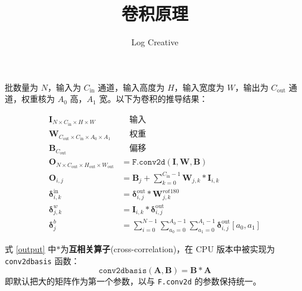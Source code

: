 \documentclass{ctexart}
\begin{document}
    \title{卷积原理}
    \author{Log Creative}
    \date{}
    \maketitle

    批数量为 $N$，输入为 $C_\text{in}$ 通道，输入高度为 $H$，输入宽度为 $W$，输出为 $C_\text{out}$ 通道，权重核为 $A_0$ 高，$A_1$ 宽。以下为卷积的推导结果\cite{gate}：

    \begin{align}
        \mathbf{I}_{N\times C_\text{in}\times H\times W}&\quad\text{输入}\nonumber\\
        \mathbf{W}_{C_\text{out}\times C_\text{in}\times A_0\times A_1}&\quad\text{权重}\nonumber\\
        \mathbf{B}_{C_\text{out}}&\quad\text{偏移}\nonumber\\
        \mathbf{O}_{N\times C_\text{out}\times H_\text{out}\times W_\text{out}}&=\texttt{F.conv2d}(\mathbf{I},\mathbf{W},\mathbf{B})\\
        \mathbf{O}_{i,j}&=\mathbf{B}_j+\sum_{k=0}^{C_\text{in}-1}\mathbf{W}_{j,k}*\mathbf{I}_{i,k}\label{output}\\
        \mathbf{\delta}^\text{in}_{i,k}&=\mathbf{\delta}^\text{out}_{i,j}*\mathbf{W}^{rot180}_{j,k}\label{deltain}\\
        \mathbf{\delta}^{w}_{j,k}&=\mathbf{I}_{i,k}*\mathbf{\delta}^\text{out}_{i,j}\label{deltaweight}\\
        \mathbf{\delta}^{b}_{j}&=\sum_{i=0}^{N-1}\sum_{a_0=0}^{A_0-1}\sum_{a_1=0}^{A_1-1}\mathbf{\delta}^\text{out}_{i,j}[a_0,a_1]\label{deltabia}
    \end{align}

    式 \eqref{output} 中$*$为\textbf{互相关算子}(cross-correlation)，在 CPU 版本中被实现为 \verb"conv2dbasis" 函数：
    \begin{equation}
        \texttt{conv2dbasis}(\mathbf{A},\mathbf{B}) = \mathbf{B}*\mathbf{A}
    \end{equation}
    即默认把大的矩阵作为第一个参数，以与 \verb"F.conv2d" 的参数保持统一。

    
\end{document}
